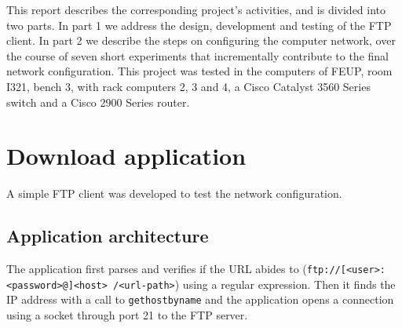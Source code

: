 \documentclass[a4paper, 11pt]{report}
\begin{document}
This report describes the corresponding project's activities, and is divided into two parts.
In part 1 we address the design, development and testing of the FTP client.
In part 2 we describe the steps on configuring the computer network, over the course of seven short experiments that incrementally contribute to the final network configuration.
This project was tested in the computers of FEUP, room I321, bench 3, with rack computers 2, 3 and 4, a Cisco Catalyst 3560 Series switch and a Cisco 2900 Series router.

\section{Download application} \label{sec:Part1}

A simple FTP client was developed to test the network configuration.

\subsection{Application architecture} \label{sec:Arc}

The application first parses and verifies if the URL abides to \cite{rfc1738} (\texttt{ftp://[<user>:<password>@]<host> /<url-path>}) using a regular expression.
Then it finds the IP address with a call to \texttt{gethostbyname} and the application opens a connection using a socket through port 21 to the FTP server. 




\end{document}
